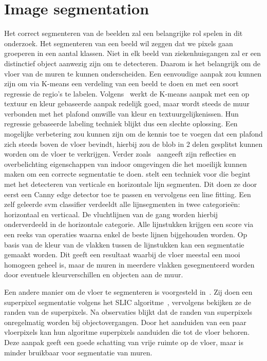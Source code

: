    \section{Image segmentation}\label{sec:image_segmentation}
        Het correct segmenteren van de beelden zal een belangrijke rol spelen in dit onderzoek.
        Het segmenteren van een beeld wil zeggen dat we pixels gaan groeperen in een aantal klassen.
        Niet in elk beeld van ziekenhuisgangen zal er een distinctief object aanwezig zijn om te detecteren. Daarom is het belangrijk om de vloer van
        de muren te kunnen onderscheiden. Een eenvoudige aanpak zou kunnen zijn om via K-means een verdeling van een beeld te doen en met een soort regressie de regio's te labelen. 
        Volgens~\cite{zhangwall} werkt de K-means aanpak met een op textuur en kleur gebaseerde aanpak redelijk goed, maar wordt steeds de muur verbonden met het plafond omwille van kleur en textuurgelijkenissen.
        Hun regressie gebaseerde labeling techniek blijkt dus een slechte oplossing.
        Een mogelijke verbetering zou kunnen zijn om de kennis toe te voegen dat een plafond zich steeds boven de vloer bevindt, hierbij zou de blob in 2 delen gesplitst kunnen worden om de vloer te verkrijgen.
        Verder zoals~\cite{Li2010} aangeeft zijn reflecties en overbelichting eigenschappen van indoor omgevingen die het moeilijk kunnen maken om
        een correcte segmentatie te doen.
        \cite{Li2010} stelt een techniek voor die begint met het detecteren van verticale en horizontale lijn segmenten. Dit doen ze door eerst een Canny edge detector\cite{Canny} toe te passen en vervolgens een line fitting.
        Een zelf geleerde \gls{svm} classifier verdeeldt alle lijnsegmenten in twee categorie\"{e}n: horizontaal en verticaal. De vluchtlijnen van de gang worden hierbij onderverdeeld in de horizontale categorie.
        Alle lijnstukken krijgen een score via een reeks van operaties waarna enkel de beste lijnen bijgehouden worden. Op basis van de kleur van de vlakken tussen de lijnstukken kan een segmentatie gemaakt worden.
        Dit geeft een resultaat waarbij de vloer meestal een mooi homogeen geheel is, maar de muren in meerdere vlakken gesegmenteerd worden door eventuele kleurverschillen en objecten aan de muur.
        
        Een andere manier om de vloer te segmenteren is voorgesteld in~\cite{Rodriguez-Telles2013}. Zij doen een superpixel segmentatie volgens het SLIC algoritme~\cite{slic}, vervolgens bekijken ze de randen van de superpixels.
        Na observaties blijkt dat de randen van superpixels onregelmatig worden bij objectovergangen. Door het aanduiden van een paar vloerpixels kan hun algoritme superpixels aanduiden die tot de vloer behoren.
        Deze aanpak geeft een goede schatting van vrije ruimte op de vloer, maar is minder bruikbaar voor segmentatie van muren.


